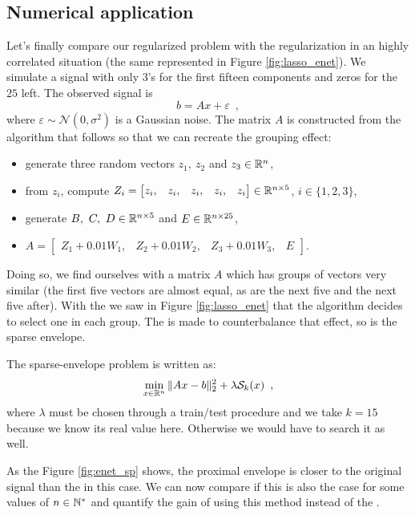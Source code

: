 \subsection{Numerical application}

Let's finally compare our regularized problem with the \enet
regularization in an highly correlated situation (the same represented in Figure \ref{fig:lasso_enet}).
We simulate a signal with only $3$'s for the first fifteen components and zeros for the $25$ left. The observed signal is 
\[ b = Ax + \varepsilon\enspace,\]
where $\varepsilon\sim\mathcal{N}(0,\sigma^2)$ is a Gaussian noise.
The matrix $A$ is constructed from the algorithm that follows so that we can recreate the grouping effect:
\begin{itemize}
\setlength{\arraycolsep}{1pt} %
    \item generate three random vectors $z_1,\ z_2$ and $z_3\in\mathbb{R}^n$,
    \item from $z_i$, compute $Z_i=\begin{bmatrix} z_i, & z_i, & z_i, & z_i, & z_i\end{bmatrix}\in\mathbb{R}^{n\times 5}$, $i\in\{1,2,3\}$,
    \item generate $B,\ C,\ D\in\mathbb{R}^{n\times 5}$ and $E\in\mathbb{R}^{n\times 25}$,
    \item $A=\begin{bmatrix}Z_1 + 0.01 W_1, & Z_2 + 0.01 W_2, & Z_3 + 0.01 W_3, & E \end{bmatrix}$.
\end{itemize}
Doing so, we find ourselves with a matrix $A$ which has groups of vectors very similar (the first five vectors are almost equal, as are the next five and the next five after). With the \lasso we saw in Figure \ref{fig:lasso_enet} that the algorithm decides to select one in each group. The \enet is made to counterbalance that effect, so is the sparse envelope.


The sparse-envelope problem is written as:
\[\min_{x\in \mathbb{R}^n} \|Ax-b\|^2_2 + \lambda\mathcal{S}_k(x)\enspace,\]
where $\lambda$ must be chosen through a train/test procedure and we take $k=15$ because we know its real value here. Otherwise we would have to search it as well.

\medskip

As the Figure \ref{fig:enet_sp} shows, the proximal envelope is closer to the original signal than the \enet in this case.
We can now compare if this is also the case for some values of $n\in\mathbb{N}^*$ and quantify the gain of using this method instead of the \enet.


